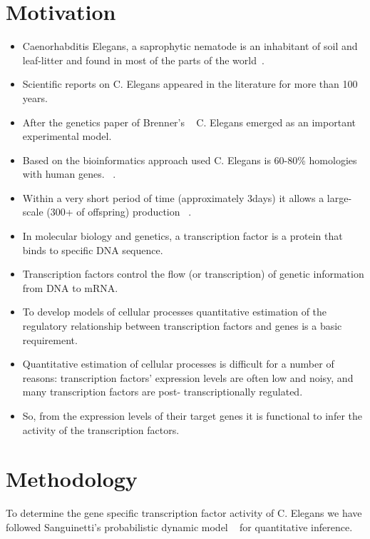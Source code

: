 \documentclass[12pt]{article}
\begin{document}
\maketitle


\section{Motivation}
	\begin{itemize}
	  \item Caenorhabditis Elegans, a saprophytic nematode is an inhabitant of soil and leaf-litter and found 
		in most of the parts of the world~\cite{hope}.
	  \item Scientific reports on C. Elegans appeared in the literature for more than 100 years.
	  \item After the genetics paper of Brenner's ~\cite{brenner} C. Elegans emerged 
		as an important experimental model.
	  \item Based on the bioinformatics approach used C. Elegans is 60-80\% homologies with human genes. ~\cite{kaletta}.
	  \item Within a very short period of time (approximately 3days) it allows a large-scale 
		(300+ of offspring) production ~\cite{hope}. 
	  \item In molecular biology and genetics, a transcription factor is a protein that binds to specific DNA sequence.
	  \item Transcription factors control the flow (or transcription) of genetic information from DNA to mRNA. 
	  \item To develop models of cellular processes quantitative estimation of the regulatory relationship 
		between transcription factors and genes is a basic requirement. 
	  \item Quantitative estimation of cellular processes is difficult for a number of reasons: 
		transcription factors’ expression levels are often low and noisy, and many transcription 
		factors are post- transcriptionally regulated. 
	  \item So, from the expression levels of their target genes it is functional to infer the activity of the transcription factors.

	\end{itemize}

\section{Methodology}\label{mehhodology}
To determine the gene specific transcription factor activity of C. Elegans we have followed Sanguinetti's probabilistic
dynamic model ~\cite{sanguinetti:01} for quantitative inference.
\end{document}
